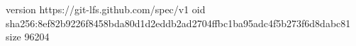 version https://git-lfs.github.com/spec/v1
oid sha256:8ef82b9226f8458bda80d1d2eddb2ad2704ffbc1ba95adc4f5b273f6d8dabc81
size 96204
